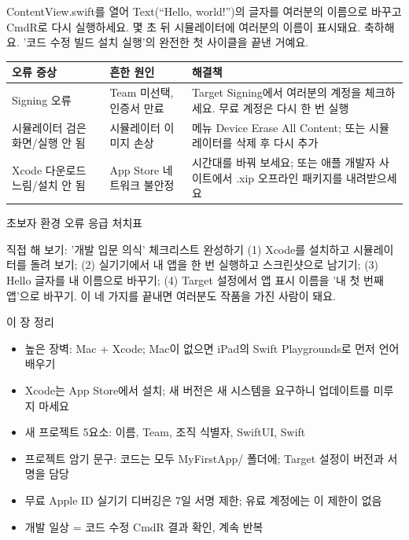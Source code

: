 

ContentView.swift를 열어 Text(“Hello, world!”)의 글자를 여러분의 이름으로 바꾸고 CmdR로 다시 실행하세요. 몇 초 뒤 시뮬레이터에 여러분의 이름이 표시돼요. 축하해요. '코드 수정 빌드 설치 실행'의 완전한 첫 사이클을 끝낸 거예요.

\begin{center}
\begin{tabularx}{\linewidth}{|X|X|X|}
\hline
\textbf{오류 증상} & \textbf{흔한 원인} & \textbf{해결책} \tabularnewline
\hline
Signing 오류 & Team 미선택, 인증서 만료 & Target Signing에서 여러분의 계정을 체크하세요. 무료 계정은 다시 한 번 실행 \tabularnewline
시뮬레이터 검은 화면/실행 안 됨 & 시뮬레이터 이미지 손상 & 메뉴 Device Erase All Content; 또는 시뮬레이터를 삭제 후 다시 추가 \tabularnewline
Xcode 다운로드 느림/설치 안 됨 & App Store 네트워크 불안정 & 시간대를 바꿔 보세요; 또는 애플 개발자 사이트에서 .xip 오프라인 패키지를 내려받으세요 \tabularnewline
\hline
\end{tabularx}
\end{center}

\begin{center}\small\color{gray}초보자 환경 오류 응급 처치표\end{center}

\begin{tcbpractice}{직접 해 보기: '개발 입문 의식' 체크리스트 완성하기}
(1) Xcode를 설치하고 시뮬레이터를 돌려 보기; (2) 실기기에서 내 앱을 한 번 실행하고 스크린샷으로 남기기; (3) Hello 글자를 내 이름으로 바꾸기; (4) Target 설정에서 앱 표시 이름을 '내 첫 번째 앱'으로 바꾸기. 이 네 가지를 끝내면 여러분도 작품을 가진 사람이 돼요.

\end{tcbpractice}

\begin{tcbsummary}{이 장 정리}
\begin{itemize}
  \item 높은 장벽: Mac + Xcode; Mac이 없으면 iPad의 Swift Playgrounds로 먼저 언어 배우기
  \item Xcode는 App Store에서 설치; 새 버전은 새 시스템을 요구하니 업데이트를 미루지 마세요
  \item 새 프로젝트 5요소: 이름, Team, 조직 식별자, SwiftUI, Swift
  \item 프로젝트 암기 문구: 코드는 모두 MyFirstApp/ 폴더에; Target 설정이 버전과 서명을 담당
  \item 무료 Apple ID 실기기 디버깅은 7일 서명 제한; 유료 계정에는 이 제한이 없음
  \item 개발 일상 = 코드 수정 CmdR 결과 확인, 계속 반복
\end{itemize}

\end{tcbsummary}
